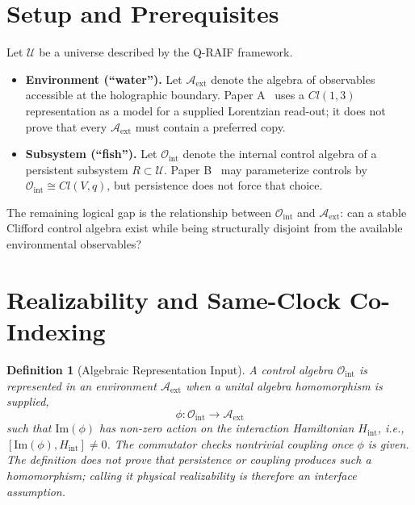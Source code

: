 \documentclass[12pt,a4paper,openany]{book}
\newtheorem{definition}[theorem]{Definition}
\begin{document}
\section{Setup and Prerequisites}
\label{C-sec:setup}

Let $\mathcal{U}$ be a universe described by the Q-RAIF framework.
\begin{itemize}
    \item \textbf{Environment (``water'').} Let $\mathcal{A}_{\mathrm{ext}}$ denote the algebra of observables accessible at the holographic boundary.
    Paper A~\cite{Liu2026QRAIF_A} uses a $Cl(1,3)$ representation as a model for a supplied Lorentzian read-out; it does not prove that every $\mathcal A_{\mathrm{ext}}$ must contain a preferred copy.
    \item \textbf{Subsystem (``fish'').} Let $\mathcal{O}_{\mathrm{int}}$ denote the internal control algebra of a persistent subsystem $R\subset\mathcal{U}$.
    Paper B~\cite{Liu2026QRAIF_B} may parameterize controls by $\mathcal{O}_{\mathrm{int}}\cong Cl(V,q)$, but persistence does not force that choice.
\end{itemize}

The remaining logical gap is the relationship between $\mathcal{O}_{\mathrm{int}}$ and $\mathcal{A}_{\mathrm{ext}}$: can a stable Clifford control algebra exist while being structurally disjoint from the available environmental observables?

\section{Realizability and Same-Clock Co-Indexing}
\label{C-sec:realizability}

\begin{definition}[Algebraic Representation Input]
\label{C-def:realizability}
A control algebra $\mathcal{O}_{\mathrm{int}}$ is represented in an environment $\mathcal{A}_{\mathrm{ext}}$ when a unital algebra homomorphism is supplied,
\begin{equation}
    \phi: \mathcal{O}_{\mathrm{int}} \to \mathcal{A}_{\mathrm{ext}}
\end{equation}
such that $\mathrm{Im}(\phi)$ has non-zero action on the interaction Hamiltonian $H_{\mathrm{int}}$, i.e., $[\mathrm{Im}(\phi), H_{\mathrm{int}}] \neq 0$.
The commutator checks nontrivial coupling once $\phi$ is given.  The definition does not prove that persistence or coupling produces such a homomorphism; calling it physical realizability is therefore an interface assumption.
\end{definition}
\end{document}
